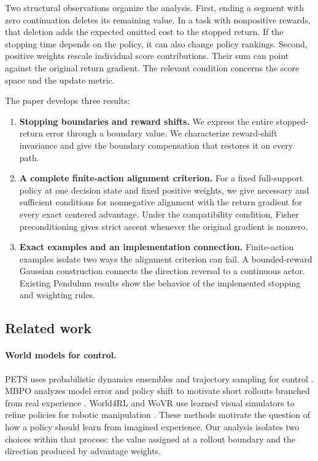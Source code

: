 Two structural observations organize the analysis. First, ending a segment with zero continuation deletes its remaining value. In a task with nonpositive rewards, that deletion adds the expected omitted cost to the stopped return. If the stopping time depends on the policy, it can also change policy rankings. Second, positive weights rescale individual score contributions. Their sum can point against the original return gradient. The relevant condition concerns the score space and the update metric.

The paper develops three results:
\begin{enumerate}
\item \textbf{Stopping boundaries and reward shifts.} We express the entire stopped-return error through a boundary value. We characterize reward-shift invariance and give the boundary compensation that restores it on every path.
\item \textbf{A complete finite-action alignment criterion.} For a fixed full-support policy at one decision state and fixed positive weights, we give necessary and sufficient conditions for nonnegative alignment with the return gradient for every exact centered advantage. Under the compatibility condition, Fisher preconditioning gives strict ascent whenever the original gradient is nonzero.
\item \textbf{Exact examples and an implementation connection.} Finite-action examples isolate two ways the alignment criterion can fail. A bounded-reward Gaussian construction connects the direction reversal to a continuous actor. Existing Pendulum results show the behavior of the implemented stopping and weighting rules.
\end{enumerate}

\subsection{Related work}

\paragraph{World models for control.}
PETS uses probabilistic dynamics ensembles and trajectory sampling for control \cite{pets}. MBPO analyzes model error and policy shift to motivate short rollouts branched from real experience \cite{mbpo}. World4RL and WoVR use learned visual simulators to refine policies for robotic manipulation \cite{world4rl,wovr}. These methods motivate the question of how a policy should learn from imagined experience. Our analysis isolates two choices within that process: the value assigned at a rollout boundary and the direction produced by advantage weights.

